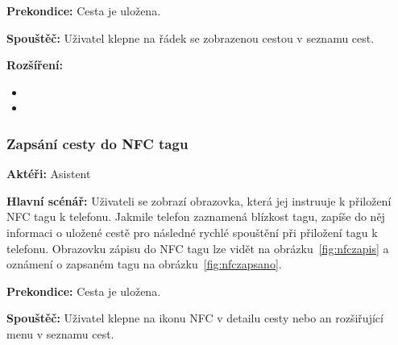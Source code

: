 \documentclass{article}
\newcommand{\usecase}[2]{\subsubsection{#1}\label{#2}}
\begin{document}
\vspace{0.1cm}
\noindent
\textbf{Prekondice:} Cesta je uložena.

\vspace{0.1cm}
\noindent
\textbf{Spouštěč:} Uživatel klepne na řádek se zobrazenou cestou v seznamu cest.

\vspace{0.1cm}
\noindent
\textbf{Rozšíření:}
\begin{itemize}
  \item {}
  \item {}
\end{itemize}






\usecase{Zapsání cesty do NFC tagu}{nfczapis}
\textbf{Aktéři:} Asistent

\vspace{0.1cm}
\noindent
\textbf{Hlavní scénář:} Uživateli se zobrazí
obrazovka, která jej instruuje k přiložení NFC tagu k telefonu. Jakmile telefon zaznamená blízkost tagu,
zapíše do něj informaci o uložené cestě pro následné rychlé spouštění při přiložení tagu k telefonu.
Obrazovku zápisu do NFC tagu lze vidět na obrázku~\ref{fig:nfczapis} a oznámení o zapsaném tagu
na obrázku~\ref{fig:nfczapsano}.

\vspace{0.1cm}
\noindent
\textbf{Prekondice:} Cesta je uložena.

\vspace{0.1cm}
\noindent
\textbf{Spouštěč:} Uživatel klepne na ikonu NFC v detailu cesty nebo an rozšiřující menu v seznamu cest.
\end{document}
